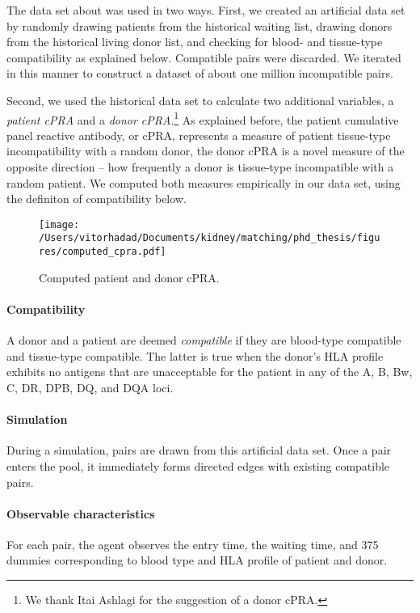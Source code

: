 \documentclass[12pt]{article}
\begin{document}
The data set about was used in two ways. First, we created an artificial data set by randomly drawing patients from the historical waiting list, drawing donors from the historical living donor list, and checking for blood- and tissue-type compatibility as explained below. Compatible pairs were discarded. We iterated in this manner to construct a dataset of about one million incompatible pairs.

Second, we  used the historical data set to calculate two additional variables, a \emph{patient cPRA} and  a \emph{donor cPRA}.\footnote{We thank Itai Ashlagi for the suggestion of a donor cPRA.} As explained before, the patient cumulative panel reactive antibody, or cPRA, represents a measure of patient tissue-type incompatibility with a random donor, the donor cPRA is a novel measure of the opposite direction -- how frequently a donor is tissue-type incompatible with a random patient. We computed both measures empirically in our data set, using the definiton of compatibility below.

\begin{figure}
\centering
\texttt{[image: /Users/vitorhadad/Documents/kidney/matching/phd\_thesis/figures/computed\_cpra.pdf]}
\caption{Computed patient and donor cPRA.}
\label{fig:cpra}
\end{figure}



\paragraph{Compatibility} A donor and a patient are deemed \emph{compatible} if they are blood-type compatible and tissue-type compatible. The latter is true when the donor's HLA profile exhibits no antigens that are unacceptable for the patient in any of the A, B, Bw, C, DR, DPB, DQ, and DQA loci.

\paragraph{Simulation} During a simulation, pairs are drawn from this artificial data set. Once a pair enters the pool, it immediately forms directed edges with existing compatible pairs.

\paragraph{Observable characteristics} For each pair, the agent observes the entry time, the waiting time, and 375 dummies corresponding to blood type and HLA profile of patient and donor. 
\end{document}

